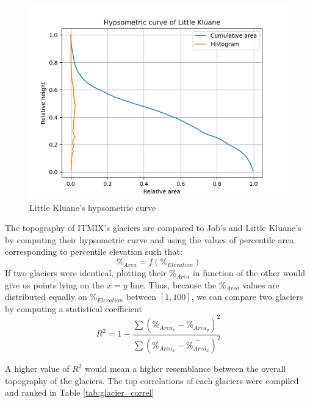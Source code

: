 \documentclass[a4, 12pt]{article}
\begin{document}
\begin{figure}[h!]
	\centering
	\includegraphics[scale=0.5]{../hypsometric_curves/Little kluane_hypso.png}
	\caption{Little Kluane's hypsometric curve}
	\label{fig:lk_hypso}
\end{figure}
The topography of ITMIX's glaciers are compared to Job's and Little Kluane's by computing their hypsometric curve and using the values of percentile area corresponding to percentile elevation such that:
\begin{equation}
\%_{Area} = f(\%_{Elevation})
\end{equation}
If two glaciers were identical, plotting their $\%_{Area}$ in function of the other would give us points lying on the $x=y$ line. Thus, because the $\%_{Area}$ values are distributed equally on $\%_{Elevation} $ between $ [1,100]$, we can compare two glaciers by computing a statistical coefficient 
\begin{equation}
R^2 = 1 - \frac{\sum(\%_{Area_x} - \%_{Area_y})^2}{\sum(\%_{Area_x} - \bar{\%_{Area_x}})^2}
\end{equation}

A higher value of $R^2$ would mean a higher resemblance between the overall topography of the glaciers.
The top correlations of each glaciers were compiled and ranked in Table \ref{tab:glacier_correl}\\
\end{document}
